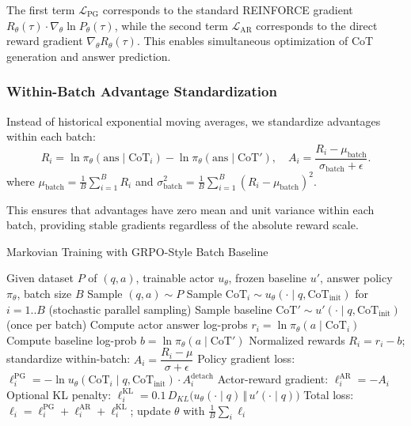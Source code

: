 \documentclass{article} %
\begin{document}
The first term $\mathcal{L}_{\text{PG}}$ corresponds to the standard REINFORCE gradient $R_\theta(\tau) \cdot \nabla_\theta \ln P_\theta(\tau)$, while the second term $\mathcal{L}_{\text{AR}}$ corresponds to the direct reward gradient $\nabla_\theta R_\theta(\tau)$. This enables simultaneous optimization of CoT generation and answer prediction.

\subsubsection{Within-Batch Advantage Standardization}
Instead of historical exponential moving averages, we standardize advantages within each batch:
\[R_i=\ln \pi_\theta(\text{ans} \mid \text{CoT}_i) - \ln \pi_\theta(\text{ans} \mid \text{CoT}'),\quad
A_i=\frac{R_i - \mu_{\text{batch}}}{\sigma_{\text{batch}} + \epsilon}.\]
where $\mu_{\text{batch}} = \frac{1}{B}\sum_{i=1}^B R_i$ and $\sigma_{\text{batch}}^2 = \frac{1}{B}\sum_{i=1}^B (R_i - \mu_{\text{batch}})^2$.

This ensures that advantages have zero mean and unit variance within each batch, providing stable gradients regardless of the absolute reward scale.

 
\begin{algorithm}[t]
\caption{Markovian Training with GRPO-Style Batch Baseline}
\label{alg:markovian_training}
\begin{algorithmic}[1]
\STATE Given dataset $P$ of $(q,a)$, trainable actor $u_\theta$, frozen baseline $u'$, answer policy $\pi_\theta$, batch size $B$
  \STATE Sample $(q,a) \sim P$
  \STATE Sample $\text{CoT}_i \sim u_\theta(\cdot\mid q,\text{CoT}_{\text{init}})$ for $i=1..B$ (stochastic parallel sampling)
  \STATE Sample baseline $\text{CoT}' \sim u'(\cdot\mid q,\text{CoT}_{\text{init}})$ (once per batch)
  \STATE Compute actor answer log-probs $r_i = \ln \pi_\theta(a\mid \text{CoT}_i)$
  \STATE Compute baseline log-prob $b = \ln \pi_\theta(a\mid \text{CoT}')$
  \STATE Normalized rewards $R_i = r_i - b$; standardize within-batch: $A_i = \dfrac{R_i - \mu}{\sigma + \epsilon}$
  \STATE Policy gradient loss: $\ell^{\text{PG}}_i = -\ln u_\theta(\text{CoT}_i\mid q,\text{CoT}_{\text{init}}) \cdot A_i^{\mathrm{detach}}$
  \STATE Actor-reward gradient: $\ell^{\text{AR}}_i = -A_i$ 
  \STATE Optional KL penalty: $\ell^{\text{KL}}_i = 0.1\, D_{\!KL}\big(u_\theta(\cdot\mid q)\,\Vert\,u'(\cdot\mid q)\big)$
  \STATE Total loss: $\ell_i = \ell^{\text{PG}}_i + \ell^{\text{AR}}_i + \ell^{\text{KL}}_i$; update $\theta$ with $\tfrac{1}{B}\sum_i \ell_i$
\ENDFOR
\end{algorithmic}
\end{algorithm}
\end{document}
